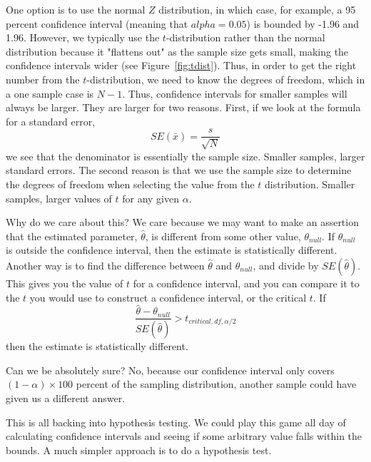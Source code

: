 One option is to use the normal $Z$ distribution, in which case, for example, a 95 percent confidence interval (meaning that $alpha = 0.05$) is bounded by -1.96 and 1.96. However, we typically use the $t$-distribution rather than the normal distribution because it "flattens out" as the sample size gets small, making the confidence intervals wider (see Figure~\ref{fig:tdist}). Thus, in order to get the right number from the $t$-distribution, we need to know the degrees of freedom, which in a one sample case is $N - 1$. Thus, confidence intervals for smaller samples will always be larger. They are larger for two reasons. First, if we look at the formula for a standard error,
\begin{equation}
SE\left(\bar{x}\right) = \frac{s}{\sqrt{N}}
\end{equation}
we see that the denominator is essentially the sample size. Smaller samples, larger standard errors. The second reason is that we use the sample size to determine the degrees of freedom when selecting the value from the $t$ distribution. Smaller samples, larger values of $t$ for any given $\alpha$.

Why do we care about this? We care because we may want to make an assertion that the estimated parameter, $\hat{\theta}$, is different from some other value, $\theta_{null}$. If $\theta_{null}$ is outside the confidence interval, then the estimate is statistically different. Another way is to find the difference between $\hat{\theta}$ and $\theta_{null}$, and divide by $SE\left(\hat{\theta}\right)$. This gives you the value of $t$ for a confidence interval, and you can compare it to the $t$ you would use to construct a confidence interval, or the critical $t$. If
\begin{equation}
\frac{\hat{\theta}-\theta_{null}}{SE\left(\hat{\theta}\right)}>t_{critical, df, \alpha/2}
\end{equation}
then the estimate is statistically different.

Can we be absolutely sure? No, because our confidence interval only covers $\left(1-\alpha\right)\times100$ percent of the sampling distribution, another sample could have given us a different answer.

This is all backing into hypothesis testing. We could play this game all day of calculating confidence intervals and seeing if some arbitrary value falls within the bounds. A much simpler approach is to do a hypothesis test.

